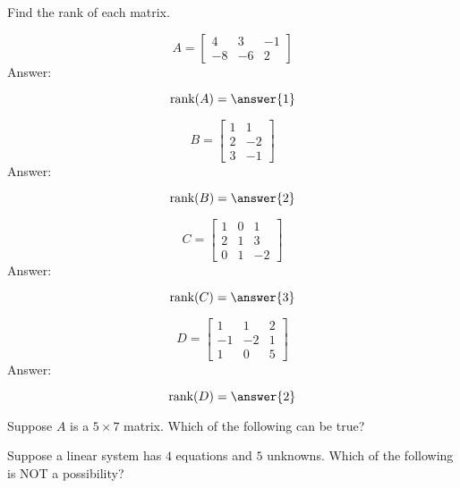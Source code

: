 \documentclass{ximera}
\begin{document}
\begin{problem}
Find the rank of each matrix.
\begin{problem}\label{prob:rankofmat1}
$$A=\begin{bmatrix}4&3&-1\\-8&-6&2\end{bmatrix}$$
Answer:

$$\mbox{rank}(A)=\answer{1}$$
\end{problem}

\begin{problem}\label{prob:rankofmat2}
$$B=\begin{bmatrix}1&1\\2&-2\\3&-1\end{bmatrix}$$
Answer:

$$\mbox{rank}(B)=\answer{2}$$
\end{problem}

\begin{problem}\label{prob:rankofmat3}
$$C=\begin{bmatrix}1&0&1\\2&1&3\\0&1&-2\end{bmatrix}$$
Answer:

$$\mbox{rank}(C)=\answer{3}$$
\end{problem}

\begin{problem}\label{prob:rankofmat4}
$$D=\begin{bmatrix}1&1&2\\-1&-2&1\\1&0&5\end{bmatrix}$$
Answer:

$$\mbox{rank}(D)=\answer{2}$$
\end{problem}
\end{problem}

\begin{problem}\label{prob:rankofmat5}
Suppose $A$ is a $5\times 7$ matrix.  Which of the following can be true?
\begin{multipleChoice}
 \end{multipleChoice}
\end{problem}

\begin{problem}\label{prob:4eq5un}
Suppose a linear system has $4$ equations and $5$ unknowns.  Which of the following is NOT a possibility?
\begin{multipleChoice}
 \end{multipleChoice}
\end{problem}
\end{document}
